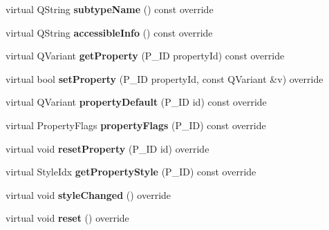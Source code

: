 \begin{DoxyCompactItemize}
\item 
\mbox{\label{class_ms_1_1_fingering_ae4622d9ea730579fa2db8e0a019d8e55}} 
virtual Q\+String {\bfseries subtype\+Name} () const override
\item 
\mbox{\label{class_ms_1_1_fingering_acca40b528a230e19b2aebe5f0529efdd}} 
virtual Q\+String {\bfseries accessible\+Info} () const override
\item 
\mbox{\label{class_ms_1_1_fingering_a5420a040a085b4a9a575ec226f7e6b10}} 
virtual Q\+Variant {\bfseries get\+Property} (P\+\_\+\+ID property\+Id) const override
\item 
\mbox{\label{class_ms_1_1_fingering_a6e19af11147ab232dfb8ab309f448d75}} 
virtual bool {\bfseries set\+Property} (P\+\_\+\+ID property\+Id, const Q\+Variant \&v) override
\item 
\mbox{\label{class_ms_1_1_fingering_a71935381544b1afc0f91a2d35888e753}} 
virtual Q\+Variant {\bfseries property\+Default} (P\+\_\+\+ID id) const override
\item 
\mbox{\label{class_ms_1_1_fingering_ae49b9d4e5835feec5c9585afaa689362}} 
virtual Property\+Flags {\bfseries property\+Flags} (P\+\_\+\+ID) const override
\item 
\mbox{\label{class_ms_1_1_fingering_a88d5d06f7ce72b11abb811c0accea005}} 
virtual void {\bfseries reset\+Property} (P\+\_\+\+ID id) override
\item 
\mbox{\label{class_ms_1_1_fingering_a191f6f3300759556e48017e01088b93e}} 
virtual Style\+Idx {\bfseries get\+Property\+Style} (P\+\_\+\+ID) const override
\item 
\mbox{\label{class_ms_1_1_fingering_a30593ac86332b3db2f310bfa59cf6fef}} 
virtual void {\bfseries style\+Changed} () override
\item 
\mbox{\label{class_ms_1_1_fingering_adeec3480a3d665e9116baf1c799df540}} 
virtual void {\bfseries reset} () override
\end{DoxyCompactItemize}

